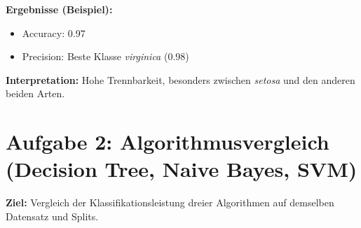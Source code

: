 \documentclass[a4paper,12pt]{article}
\begin{document}
\textbf{Ergebnisse (Beispiel):}
\begin{itemize}
  \item Accuracy: 0.97
  \item Precision: Beste Klasse \textit{virginica} (0.98)
\end{itemize}

\textbf{Interpretation:} Hohe Trennbarkeit, besonders zwischen \textit{setosa} und den anderen beiden Arten.

\newpage

\section*{Aufgabe 2: Algorithmusvergleich (Decision Tree, Naive Bayes, SVM)}

\textbf{Ziel:} Vergleich der Klassifikationsleistung dreier Algorithmen auf demselben Datensatz und Splits.\\
\end{document}
